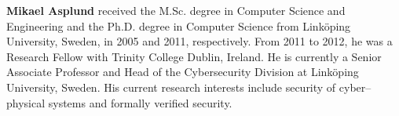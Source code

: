 \documentclass[fleqn,s1,names,tex]{neptune}
\begin{document}
\xvfill\xeject
\xpar\cvskip[-23pt] 

\begin{biography}
\textbf{Mikael Asplund} received the M.Sc. degree in Computer Science and Engineering and the Ph.D. degree in Computer Science from Link\"oping University, Sweden, in 2005 and 2011, respectively. From 2011 to 2012, he was a Research Fellow with Trinity College Dublin, Ireland. 
He is currently a Senior Associate Professor and Head of the Cybersecurity Division at Link\"oping University, Sweden. His current research interests include security of cyber--physical systems and formally verified security.%
\end{biography}


 
\end{document}
